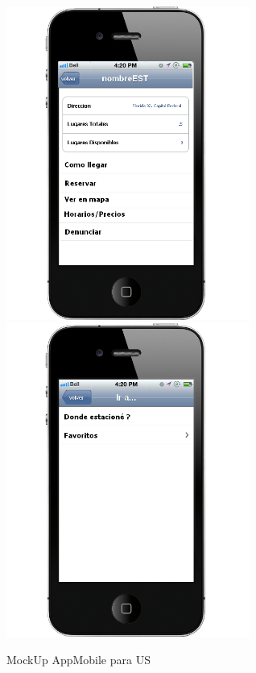 \documentclass[spanish, DIV=calc, paper=a4, fontsize=11pt, twocolumn]{scrartcl}	 %
\begin{document}
\begin{figure}[htp]
\includegraphics[width=8.0cm,height=\paperheight,keepaspectratio]{img/mockUpAppMobileUS/nombreestacionamiento.png}%
\includegraphics[width=8.0cm,height=\paperheight,keepaspectratio]{img/mockUpAppMobileUS/ira.png}%
\caption{MockUp AppMobile para US}
\label{dash-1}
\end{figure}
\end{document}
